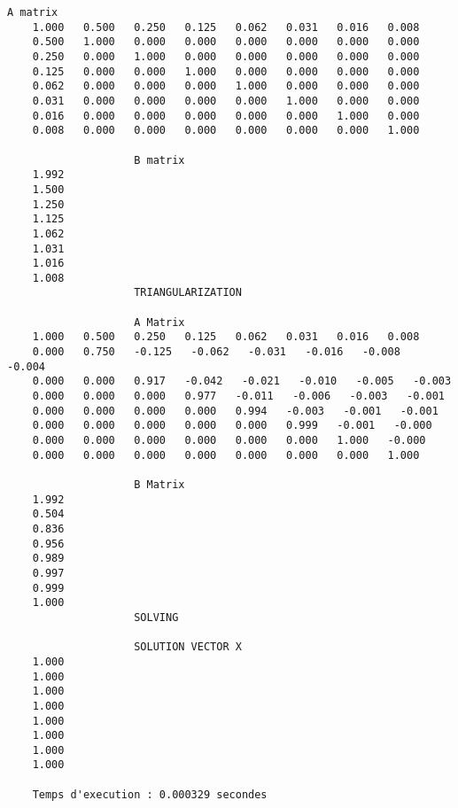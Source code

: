 \begin{lstlisting}[caption={$A_7X=B$} results, basicstyle=\fontsize{5}{8}\selectfont]
					A matrix 
	1.000   0.500   0.250   0.125   0.062   0.031   0.016   0.008   
	0.500   1.000   0.000   0.000   0.000   0.000   0.000   0.000   
	0.250   0.000   1.000   0.000   0.000   0.000   0.000   0.000   
	0.125   0.000   0.000   1.000   0.000   0.000   0.000   0.000   
	0.062   0.000   0.000   0.000   1.000   0.000   0.000   0.000   
	0.031   0.000   0.000   0.000   0.000   1.000   0.000   0.000   
	0.016   0.000   0.000   0.000   0.000   0.000   1.000   0.000   
	0.008   0.000   0.000   0.000   0.000   0.000   0.000   1.000   
	
					B matrix 
	1.992   
	1.500   
	1.250   
	1.125   
	1.062   
	1.031   
	1.016   
	1.008   
					TRIANGULARIZATION 
	
					A Matrix 
	1.000   0.500   0.250   0.125   0.062   0.031   0.016   0.008   
	0.000   0.750   -0.125   -0.062   -0.031   -0.016   -0.008   -0.004   
	0.000   0.000   0.917   -0.042   -0.021   -0.010   -0.005   -0.003   
	0.000   0.000   0.000   0.977   -0.011   -0.006   -0.003   -0.001   
	0.000   0.000   0.000   0.000   0.994   -0.003   -0.001   -0.001   
	0.000   0.000   0.000   0.000   0.000   0.999   -0.001   -0.000   
	0.000   0.000   0.000   0.000   0.000   0.000   1.000   -0.000   
	0.000   0.000   0.000   0.000   0.000   0.000   0.000   1.000   
	
					B Matrix 
	1.992   
	0.504   
	0.836   
	0.956   
	0.989   
	0.997   
	0.999   
	1.000   
					SOLVING 
	
					SOLUTION VECTOR X 
	1.000   
	1.000   
	1.000   
	1.000   
	1.000   
	1.000   
	1.000   
	1.000   
	
	Temps d'execution : 0.000329 secondes
\end{lstlisting}
